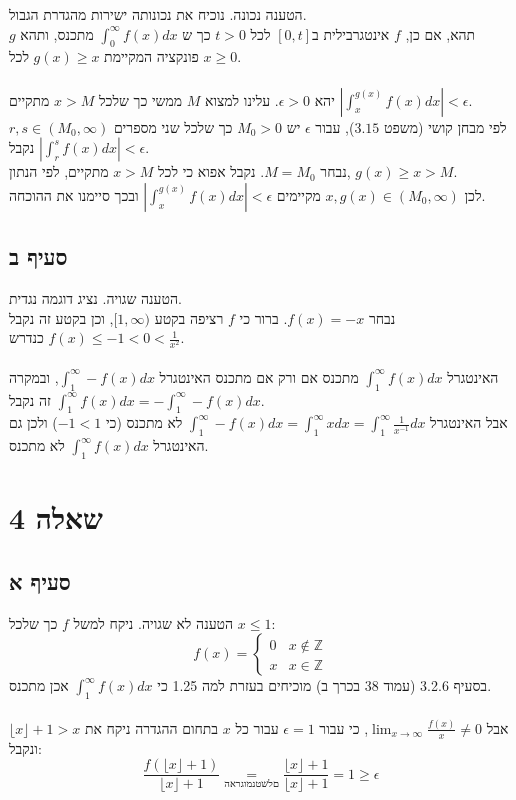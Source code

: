 \documentclass{article}
\newcommand\underrel[2]{\mathrel{\mathop{#2}\limits_{#1}}}
\begin{document}
הטענה נכונה. נוכיח את נכונותה ישירות מהגדרת הגבול. \\
תהא, אם כן, $f$
אינטגרבילית ב$[0,t]$
לכל $t>0$
כך ש $\int_0^\infty f(x)dx$ מתכנס,
ותהא $g$ פונקציה המקיימת $g(x)\geq x$ לכל $x\geq 0$.
\\\\
יהא $\epsilon >0$.
עלינו למצוא $M$
ממשי כך שלכל $x>M$ מתקיים $\left| \int_x^{g(x)}f(x)dx \right| < \epsilon$. \\
לפי מבחן קושי (משפט $3.15$),
עבור $\epsilon$ יש $M_0>0$
כך שלכל שני מספרים $r,s\in(M_0, \infty)$ נקבל $\left| \int_r^sf(x)dx \right| < \epsilon$. \\
נבחר $M=M_0$. נקבל אפוא כי לכל $x>M$ מתקיים, לפי הנתון, $g(x)\geq x > M$. \\
לכן $x, g(x)\in (M_0, \infty)$ מקיימים $\left| \int_x^{g(x)}f(x)dx \right| < \epsilon$
ובכך סיימנו את ההוכחה.

\subsection*{סעיף ב}

הטענה שגויה. נציג דוגמה נגדית. \\
נבחר $f(x)=-x$. ברור כי $f$ רציפה בקטע $[1, \infty)$,
וכן בקטע זה נקבל $f(x) \leq -1 < 0 < \frac{1}{x^2}$ כנדרש.
\\\\
האינטגרל $\int_1^{\infty} f(x)dx$ מתכנס אם ורק אם מתכנס האינטגרל $\int_1^{\infty}-f(x)dx$,
ובמקרה זה נקבל $\int_1^{\infty}f(x)dx=-\int_1^{\infty}-f(x)dx$. \\
אבל האינטגרל $\int_1^{\infty}-f(x)dx=\int_1^{\infty}xdx=\int_1^{\infty} \frac{1}{x^{-1}} dx$
לא מתכנס (כי $-1<1$)
ולכן גם האינטגרל $\int_1^{\infty}f(x)dx$ לא מתכנס.

\pagebreak

\section*{שאלה 4}

\subsection*{סעיף א}

הטענה לא שגויה. ניקח למשל $f$ כך שלכל $x\leq 1$:
\[
    f(x) = \begin{cases}
        0 & x\notin \mathbb{Z} \\
        x & x\in \mathbb{Z}
    \end{cases}
\]
בסעיף 3.2.6 (עמוד 38 בכרך ב)
מוכיחים בעזרת למה 1.25 כי $\int_1^\infty f(x)dx$
אכן מתכנס.
\\\\
אבל $\lim_{x\rightarrow\infty}\frac{f(x)}{x}\ne 0$,
כי עבור $\epsilon=1$ עבור כל $x$ בתחום ההגדרה ניקח את $\lfloor x \rfloor + 1 > x$ ונקבל:
\[
    \frac{f(\lfloor x \rfloor + 1)}{\lfloor x \rfloor + 1} \underrel{הארגומנט שלם}{=}
    \frac{\lfloor x \rfloor + 1}{\lfloor x \rfloor + 1} =
    1 \geq \epsilon
\]
\end{document}
